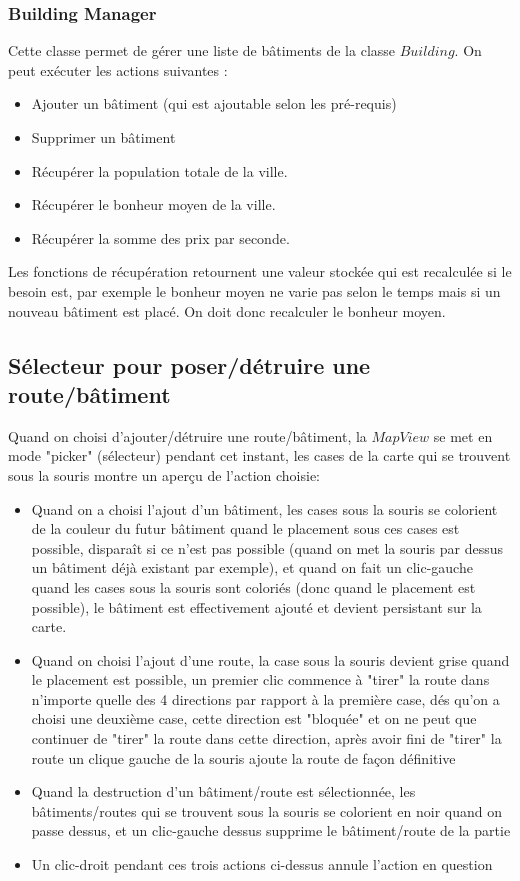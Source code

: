 \documentclass[a4paper,10pt,openany,oneside]{report}
\begin{document}
\subsubsection{Building Manager}
Cette classe permet de gérer une liste de bâtiments de la classe $Building$. On peut exécuter les actions suivantes :
\begin{itemize}
	\item Ajouter un bâtiment (qui est ajoutable selon les pré-requis)
	\item Supprimer un bâtiment 
	\item Récupérer la population totale de la ville.
	\item Récupérer le bonheur moyen de la ville.
	\item Récupérer la somme des prix par seconde.
\end{itemize}

Les fonctions de récupération retournent une valeur stockée qui est recalculée si le besoin est, par exemple le bonheur moyen ne varie pas selon le temps mais si un nouveau bâtiment est placé. On doit donc recalculer le bonheur moyen.
\subsection{Sélecteur pour poser/détruire une route/bâtiment}
Quand on choisi d'ajouter/détruire une route/bâtiment, la $MapView$ se met en mode "picker" (sélecteur) pendant cet instant, les cases de la carte qui se trouvent sous la souris montre un aperçu de l'action choisie:
\begin{itemize}
\item Quand on a choisi l'ajout d'un bâtiment, les cases sous la souris se colorient de la couleur du futur bâtiment quand le placement sous ces cases est possible, disparaît si ce n'est pas possible (quand on met la souris par dessus un bâtiment déjà existant par exemple), et quand on fait un clic-gauche quand les cases sous la souris sont coloriés (donc quand le placement est possible), le bâtiment est effectivement ajouté et devient persistant sur la carte.
\item Quand on choisi l'ajout d'une route, la case sous la souris devient grise quand le placement est possible, un premier clic commence à "tirer" la route dans n'importe quelle des 4 directions par rapport à la première case, dés qu'on a choisi une deuxième case, cette direction est "bloquée" et on ne peut que continuer de "tirer" la route dans cette direction, après avoir fini de "tirer" la route un clique gauche de la souris ajoute la route de façon définitive
\item Quand la destruction d'un bâtiment/route est sélectionnée, les bâtiments/routes qui se trouvent sous la souris se colorient en noir quand on passe dessus, et un clic-gauche dessus supprime le bâtiment/route de la partie
\item Un clic-droit pendant ces trois actions ci-dessus annule l'action en question
\end{itemize}
\end{document}
